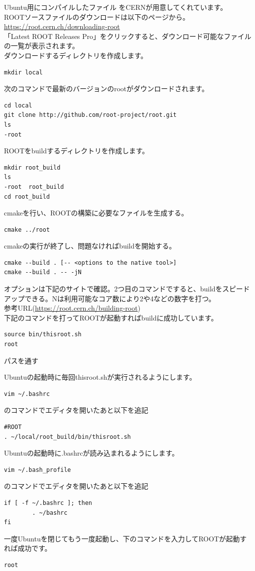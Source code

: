 Ubuntu用にコンパイルしたファイル をCERNが用意してくれています。\\
ROOTソースファイルのダウンロードは以下のページから。\\
\url{https://root.cern.ch/downloading-root}
\\
「Latest ROOT Releases Pro」をクリックすると、ダウンロード可能なファイルの一覧が表示されます。\\
ダウンロードするディレクトリを作成します。
\begin{lstlisting}
mkdir local
\end{lstlisting}
次のコマンドで最新のバージョンのrootがダウンロードされます。
\begin{lstlisting}
cd local
git clone http://github.com/root-project/root.git
ls
-root
\end{lstlisting}
ROOTをbuildするディレクトリを作成します。
\begin{lstlisting}
mkdir root_build
ls
-root  root_build
cd root_build
\end{lstlisting}
cmakeを行い、ROOTの構築に必要なファイルを生成する。
\begin{lstlisting}
cmake ../root
\end{lstlisting}
cmakeの実行が終了し、問題なければbuildを開始する。
\begin{lstlisting}
cmake --build . [-- <options to the native tool>]
cmake --build . -- -jN
\end{lstlisting}
オプションは下記のサイトで確認。2つ目のコマンドですると、buildをスピードアップできる。Nは利用可能なコア数により2や4などの数字を打つ。\\
参考URL(\url{https://root.cern.ch/building-root})\\
下記のコマンドを打ってROOTが起動すればbuildに成功しています。
\begin{lstlisting}
source bin/thisroot.sh
root
\end{lstlisting}
\vspace{0.3cm}
パスを通す
\vspace{0.3cm}

Ubuntuの起動時に毎回thisroot.shが実行されるようにします。
\begin{lstlisting}
vim ~/.bashrc
\end{lstlisting}
のコマンドでエディタを開いたあと以下を追記
\begin{lstlisting}
#ROOT
. ~/local/root_build/bin/thisroot.sh
\end{lstlisting}
Ubuntuの起動時に.bashrcが読み込まれるようにします。
\begin{lstlisting}
vim ~/.bash_profile
\end{lstlisting}
のコマンドでエディタを開いたあと以下を追記
\begin{lstlisting}
if [ -f ~/.bashrc ]; then
        . ~/bashrc
fi
\end{lstlisting}
一度Ubuntuを閉じてもう一度起動し、下のコマンドを入力してROOTが起動すれば成功です。
\begin{lstlisting}
root
\end{lstlisting}

